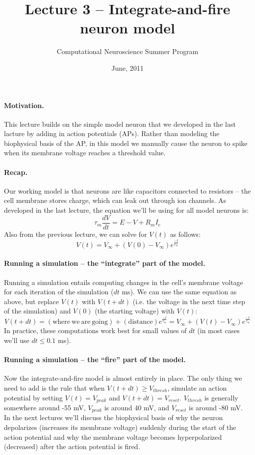 \documentclass[12pt]{article}
\title{Lecture 3 -- Integrate-and-fire neuron model}
\author{Computational Neuroscience Summer Program}
\date{June, 2011}
\begin{document}
\maketitle

\paragraph{Motivation.}  This lecture builds on the simple model
neuron that we developed in the last lacture by adding in action
potentials (APs).  Rather than modeling the biophysical basis of the
AP, in this model we manually cause the neuron to spike when its
membrane voltage reaches a threshold value.

\paragraph{Recap.}  Our working model is that neurons are like
capacitors connected to resistors -- the cell membrane stores charge,
which can leak out through ion channels.  As developed in the last
lecture, the equation we'll be using for all model neurons is:
\[
\tau_m\frac{dV}{dt} = E - V + R_mI_e
\]
Also from the previous lecture, we can solve for $V(t)$ as follows:
\[
V(t) = V_\infty + (V(0) - V_\infty) e^\frac{-t}{\tau_m}
\]

\paragraph{Running a simulation -- the ``integrate'' part of the
  model.}  Running a simulation entails
computing changes in the cell's membrane voltage for each iteration of the
simulation ($dt$ ms).  We can use the same equation as above, but
replace $V(t)$ with $V(t+dt)$ (i.e. the voltage in the next time step of
the simulation) and $V(0)$ (the starting voltage) with $V(t)$:
\[
V(t+dt) = \mathrm{(where~we~are~going)} +
\mathrm{(distance)}e^\frac{-t}{\tau_m} = V_\infty + (V(t) -
V_\infty)e^\frac{-t}{\tau_m}
\]
In practice, these computations work best for small values of $dt$ (in most cases
we'll use $dt \leq 0.1$ ms).

\paragraph{Running a simulation -- the ``fire'' part of the model.}
Now the integrate-and-fire model is almost entirely in place.  The
only thing we need to add is the rule that when $V(t+dt) \geq V_{thresh}$, simulate an action potential by 
setting $V(t) = V_{peak}$ and $V(t+dt) = V_{reset}$.  $V_{thresh}$ is
generally somewhere around -55 mV, $V_{peak}$ is around 40 mV, and
$V_{reset}$ is around -80 mV.  In the next lectures we'll discuss the biophysical
basis of why the neuron depolarizes (increases its membrane voltage)
suddenly during the start of the action potential and why the membrane
voltage becomes hyperpolarized (decreased) after the action potential is fired.
\end{document}

